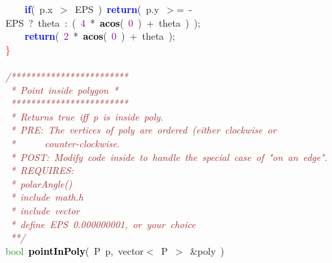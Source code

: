 {{\mbox{}\ \ \ \ \textbf{\textcolor{Blue}{if}}\textcolor{BrickRed}{(}\ p\textcolor{BrickRed}{.}x\ \textcolor{BrickRed}{$>$}\ EPS\ \textcolor{BrickRed}{)}\ \textbf{\textcolor{Blue}{return}}\textcolor{BrickRed}{(}\ p\textcolor{BrickRed}{.}y\ \textcolor{BrickRed}{$>$=}\ \textcolor{BrickRed}{-}EPS\ \textcolor{BrickRed}{?}\ theta\ \textcolor{BrickRed}{:}\ \textcolor{BrickRed}{(}\ \textcolor{Purple}{4}\ \textcolor{BrickRed}{*}\ \textbf{\textcolor{Black}{acos}}\textcolor{BrickRed}{(}\ \textcolor{Purple}{0}\ \textcolor{BrickRed}{)}\ \textcolor{BrickRed}{+}\ theta\ \textcolor{BrickRed}{)}\ \textcolor{BrickRed}{);} \\
\mbox{}\ \ \ \ \textbf{\textcolor{Blue}{return}}\textcolor{BrickRed}{(}\ \textcolor{Purple}{2}\ \textcolor{BrickRed}{*}\ \textbf{\textcolor{Black}{acos}}\textcolor{BrickRed}{(}\ \textcolor{Purple}{0}\ \textcolor{BrickRed}{)}\ \textcolor{BrickRed}{+}\ theta\ \textcolor{BrickRed}{);} \\
\mbox{}\textcolor{Red}{\}} \\
\mbox{} \\
\mbox{}\textit{\textcolor{Brown}{/************************}} \\
\mbox{}\textit{\textcolor{Brown}{\ *\ Point\ inside\ polygon\ *}} \\
\mbox{}\textit{\textcolor{Brown}{\ ************************}} \\
\mbox{}\textit{\textcolor{Brown}{\ *\ Returns\ true\ iff\ p\ is\ inside\ poly.}} \\
\mbox{}\textit{\textcolor{Brown}{\ *\ PRE:\ The\ vertices\ of\ poly\ are\ ordered\ (either\ clockwise\ or}} \\
\mbox{}\textit{\textcolor{Brown}{\ *\ \ \ \ \ \ counter-clockwise.}} \\
\mbox{}\textit{\textcolor{Brown}{\ *\ POST:\ Modify\ code\ inside\ to\ handle\ the\ special\ case\ of\ "{}on\ an\ edge"{}.}} \\
\mbox{}\textit{\textcolor{Brown}{\ *\ REQUIRES:}} \\
\mbox{}\textit{\textcolor{Brown}{\ *\ polarAngle()}} \\
\mbox{}\textit{\textcolor{Brown}{\ *\ include\ math.h}} \\
\mbox{}\textit{\textcolor{Brown}{\ *\ include\ vector}} \\
\mbox{}\textit{\textcolor{Brown}{\ *\ define\ EPS\ 0.000000001,\ or\ your\ choice}} \\
\mbox{}\textit{\textcolor{Brown}{\ **/}} \\
\mbox{}\textcolor{ForestGreen}{bool}\ \textbf{\textcolor{Black}{pointInPoly}}\textcolor{BrickRed}{(}\ P\ p\textcolor{BrickRed}{,}\ vector\textcolor{BrickRed}{$<$}\ P\ \textcolor{BrickRed}{$>$}\ \textcolor{BrickRed}{\&}poly\ \textcolor{BrickRed}{)} \\
}}
